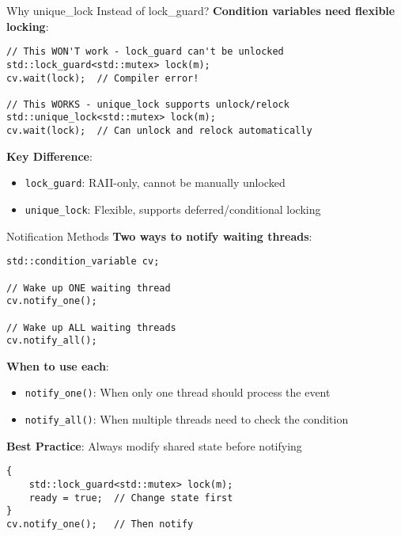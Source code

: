 \begin{frame}[fragile]{Why unique\_lock Instead of lock\_guard?}
	\textbf{Condition variables need flexible locking}:

	\begin{verbatim}
// This WON'T work - lock_guard can't be unlocked
std::lock_guard<std::mutex> lock(m);
cv.wait(lock);  // Compiler error!

// This WORKS - unique_lock supports unlock/relock
std::unique_lock<std::mutex> lock(m);
cv.wait(lock);  // Can unlock and relock automatically
	\end{verbatim}

	\vspace{0.5em}
	\textbf{Key Difference}:
	\begin{itemize}
		\item \texttt{lock\_guard}: RAII-only, cannot be manually unlocked
		\item \texttt{unique\_lock}: Flexible, supports deferred/conditional locking
	\end{itemize}
\end{frame}

\begin{frame}[fragile]{Notification Methods}
	\textbf{Two ways to notify waiting threads}:

	\begin{verbatim}
std::condition_variable cv;

// Wake up ONE waiting thread
cv.notify_one();

// Wake up ALL waiting threads
cv.notify_all();
	\end{verbatim}

	\vspace{1em}
	\textbf{When to use each}:
	\begin{itemize}
		\item \texttt{notify\_one()}: When only one thread should process the event
		\item \texttt{notify\_all()}: When multiple threads need to check the condition
	\end{itemize}

	\vspace{0.5em}
	\textbf{Best Practice}: Always modify shared state before notifying
	\begin{verbatim}
{
    std::lock_guard<std::mutex> lock(m);
    ready = true;  // Change state first
}
cv.notify_one();   // Then notify
	\end{verbatim}
\end{frame}

